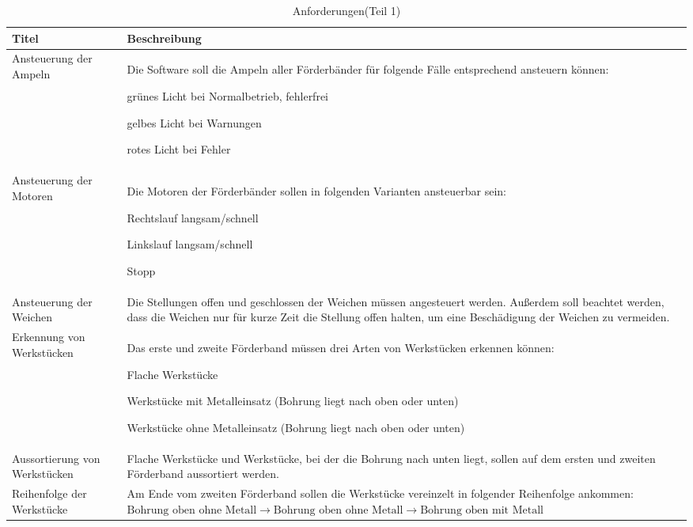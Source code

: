 \documentclass[a4paper, 11pt]{article}
\newcommand{\su}{\glqq} %
\newcommand{\so}{\grqq\xspace} %
\begin{document}
\begin{table}[H]
\centering
    \begin{tabularx}{\textwidth}{|X|X|}
    \hline
    \textbf{Titel}&\textbf{Beschreibung}\\
    \hline
    Ansteuerung der Ampeln&Die Software soll die Ampeln aller Förderbänder für folgende Fälle entsprechend ansteuern können:
    \begin{compactenum}[-]
        \item grünes Licht bei Normalbetrieb, fehlerfrei 
        \item gelbes Licht bei Warnungen 
        \item rotes Licht bei Fehler 
    \end{compactenum}\\
    \hline
    Ansteuerung der Motoren&Die Motoren der Förderbänder sollen in folgenden Varianten ansteuerbar sein: 
    \begin{compactenum}[-]
        \item Rechtslauf langsam/schnell
        \item Linkslauf langsam/schnell
        \item Stopp
    \end{compactenum}\\
    \hline
    Ansteuerung der Weichen&Die Stellungen \su offen\so und \su geschlossen\so der Weichen müssen angesteuert werden. Außerdem soll beachtet werden, dass die Weichen nur für kurze Zeit die Stellung \su offen\so halten, um eine Beschädigung der Weichen zu vermeiden.\\
    \hline
    Erkennung von Werkstücken&Das erste und zweite Förderband müssen drei Arten von Werkstücken erkennen können: 
    \begin{compactenum}[-]
        \item Flache Werkstücke 
        \item Werkstücke mit Metalleinsatz (Bohrung liegt nach oben oder unten) 
        \item Werkstücke ohne Metalleinsatz (Bohrung liegt nach oben oder unten)
    \end{compactenum}\\
    \hline
    Aussortierung von Werkstücken&Flache Werkstücke und Werkstücke, bei der die Bohrung nach unten liegt, sollen auf dem ersten und zweiten Förderband aussortiert werden. \\
    \hline
    Reihenfolge der Werkstücke&Am Ende vom zweiten Förderband sollen die Werkstücke vereinzelt in folgender Reihenfolge ankommen:\hspace{2cm}
$\text{Bohrung oben ohne Metall}\rightarrow \text{Bohrung oben ohne Metall}\rightarrow \text{Bohrung oben mit Metall}$ \\
    \hline
    \end{tabularx}
    \caption{Anforderungen(Teil 1)}
    \label{anf1}
\end{table}
\end{document}
